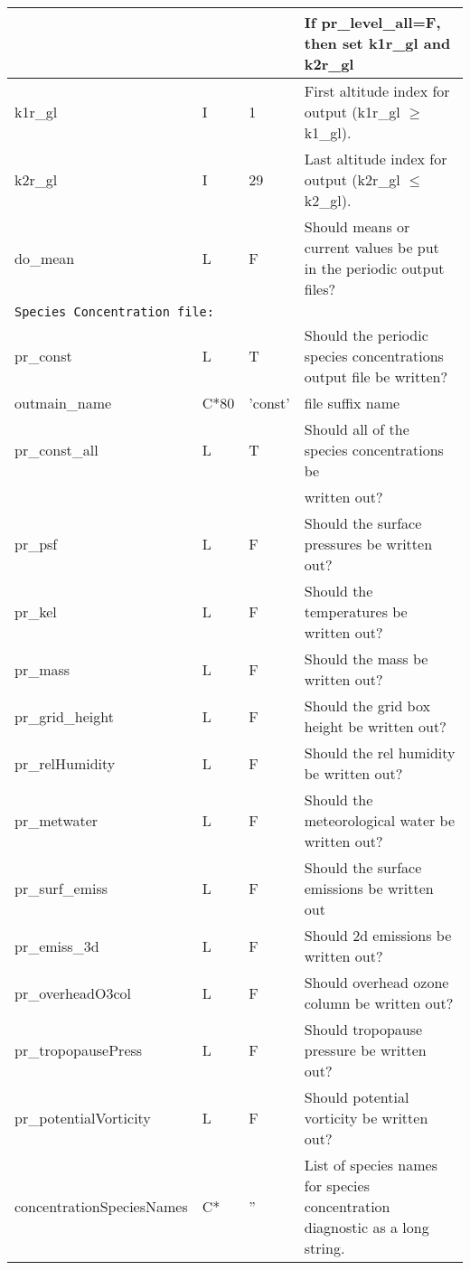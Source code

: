{\begin{landscape}
\begin{center}
\begin{longtable}{|l|l|l|l|}
                &      &            & If pr\_level\_all=F, then set k1r\_gl and k2r\_gl  \\ \hline
k1r\_gl         & I    &  1         & First altitude index for output (k1r\_gl $\ge$ k1\_gl).  \\ \hline
k2r\_gl         & I    & 29         & Last  altitude index for output (k2r\_gl $\le$ k2\_gl).  \\ \hline
do\_mean        & L & F & Should means or current values be put in the periodic output files?  \\ \hline
\multicolumn{4}{|l|}{\tt Species Concentration file: }  \\ \hline
pr\_const  & L & T & Should the periodic species concentrations output file be written?  \\ \hline
outmain\_name   &C*80&'const'& file suffix name \\ \hline
pr\_const\_all       & L & T & Should all of the species concentrations be   \\
                     &   &   & written out?  \\ \hline
pr\_psf    & L & F & Should the surface pressures be written out?  \\ \hline
pr\_kel    & L & F & Should the temperatures be written out?  \\ \hline
pr\_mass   & L & F & Should the mass be written out?  \\ \hline
pr\_grid\_height & L & F & Should the grid box height be written out?  \\ \hline
pr\_relHumidity & L & F & Should the rel humidity be written out?  \\ \hline
pr\_metwater    & L & F & Should the meteorological water be written out?  \\ \hline
pr\_surf\_emiss  & L & F & Should the surface emissions be written out   \\ \hline
pr\_emiss\_3d     & L & F & Should 2d emissions be written out?  \\ \hline
pr\_overheadO3col  & L & F & Should overhead ozone column be written out?  \\ \hline
pr\_tropopausePress  & L & F & Should tropopause pressure be written out?  \\ \hline
pr\_potentialVorticity  & L & F & Should potential vorticity be written out?  \\ \hline
concentrationSpeciesNames & C* &  ''  & List of species names for species concentration diagnostic as a long string.  \\

\end{longtable}
\end{center}
\end{landscape}}
